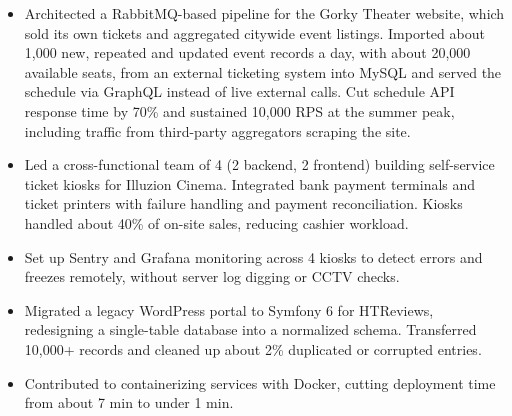 \documentclass[10pt,a4paper]{article}
\begin{document}
\newpage
{}
\begin{itemize}
  \item Architected a RabbitMQ-based pipeline for the Gorky Theater website, which sold its own tickets and aggregated citywide event listings. Imported about 1,000 new, repeated and updated event records a day, with about 20,000 available seats, from an external ticketing system into MySQL and served the schedule via GraphQL instead of live external calls. Cut schedule API response time by 70\% and sustained 10,000 RPS at the summer peak, including traffic from third-party aggregators scraping the site.
  \item Led a cross-functional team of 4 (2 backend, 2 frontend) building self-service ticket kiosks for Illuzion Cinema. Integrated bank payment terminals and ticket printers with failure handling and payment reconciliation. Kiosks handled about 40\% of on-site sales, reducing cashier workload.
  \item Set up Sentry and Grafana monitoring across 4 kiosks to detect errors and freezes remotely, without server log digging or CCTV checks.
  \item Migrated a legacy WordPress portal to Symfony 6 for HTReviews, redesigning a single-table database into a normalized schema. Transferred 10,000+ records and cleaned up about 2\% duplicated or corrupted entries.
  \item Contributed to containerizing services with Docker, cutting deployment time from about 7 min to under 1 min.
\end{itemize}



\end{document}
